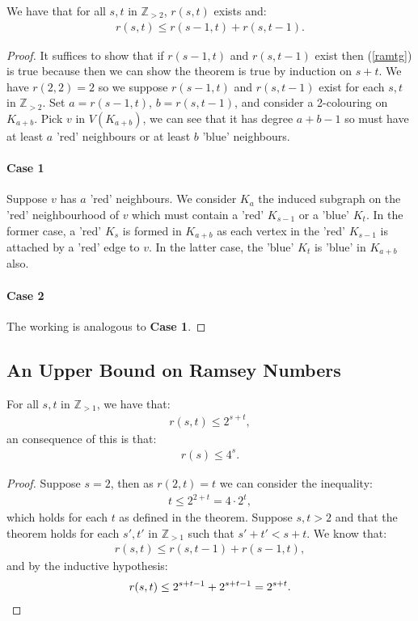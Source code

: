 We have that for all $s, t$ in $\mathbb{Z}_{> 2}$, $r(s, t)$ exists and: 
\begin{gather} \label{ramtg}
  r(s, t) \leq r(s - 1, t) + r(s, t - 1).
\end{gather}
\begin{proof}
    It suffices to show that if $r(s - 1, t)$ and $r(s, t - 1)$ exist then
    (\ref{ramtg}) is true because then we can show the theorem is true by
    induction on $s + t$. We have $r(2, 2) = 2$ so we 
    suppose $r(s - 1, t)$ and $r(s, t - 1)$ exist for each $s, t$ in 
    $\mathbb{Z}_{> 2}$. Set $a = r(s - 1, t)$, $b = r(s, t - 1)$, and
    consider a 2-colouring on $K_{a + b}$. Pick $v$ in $V(K_{a + b})$,
    we can see that it has degree $a + b - 1$ so must have at least
    $a$ 'red' neighbours or at least $b$ 'blue' neighbours. 
    
    \paragraph{Case 1} Suppose $v$ has $a$ 'red' neighbours.
    We consider $K_a$ the induced subgraph on the 'red' neighbourhood of $v$ which
    must contain a 'red' $K_{s - 1}$ or a 'blue' $K_t$. In the former case,
    a 'red' $K_s$ is formed in $K_{a + b}$ as each vertex in the 'red' $K_{s - 1}$
    is attached by a 'red' edge to $v$. In the latter case, the 'blue' $K_t$ is 'blue'
    in $K_{a + b}$ also.

    \paragraph{Case 2} The working is analogous to \textbf{Case 1}.
\end{proof}

\subsection{An Upper Bound on Ramsey Numbers}

For all $s, t$ in $\mathbb{Z}_{> 1}$, we have that: \begin{gather*}
  r(s, t) \leq 2^{s + t},
\end{gather*} an consequence of this is that: \begin{gather*}
  r(s) \leq 4^{s}.
\end{gather*}
\begin{proof}
    Suppose $s = 2$, then as $r(2, t) = t$ we can consider the inequality: 
    \begin{gather*}
        t \leq 2^{2 + t} = 4 \cdot 2^t,
    \end{gather*} which holds for each $t$ as defined in the theorem.
    Suppose $s, t > 2$ and that the theorem holds for each $s', t'$
    in $\mathbb{Z}_{> 1}$ such that $s' + t' < s + t$. We know that:
    \begin{gather*}
        r(s, t) \leq r(s, t - 1) + r(s - 1, t),
    \end{gather*} and by the inductive hypothesis: \begin{gather*}
        r(s, t) \leq 2^{s + t - 1} + 2^{s + t - 1} = 2^{s + t}. \qedhere
    \end{gather*}
\end{proof} 

